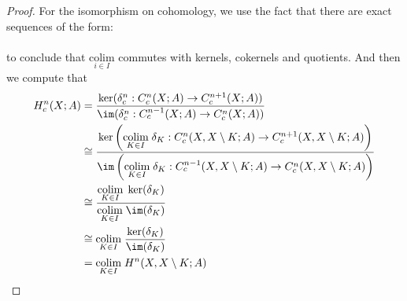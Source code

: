 \documentclass[a4paper]{article}
\begin{document}
\begin{prp}{}{}
\begin{proof}
For the isomorphism on cohomology, we use the fact that there are exact sequences of the form: \\
\\
to conclude that $\underset{i\in I}{\text{colim}}$ commutes with kernels, cokernels and quotients. And then we compute that 
\begin{align*}
H_c^n(X;A)&=\frac{\ker(\delta_c^n:C_c^n(X;A)\to C_c^{n+1}(X;A))}{\im(\delta_c^n:C_c^{n-1}(X;A)\to C_c^n(X;A))}\\
&\cong\frac{\ker\left(\underset{K\in I}{\text{colim}}\;\delta_K:C_c^n(X,X\setminus K;A)\to C_c^{n+1}(X,X\setminus K;A)\right)}{\im\left(\underset{K\in I}{\text{colim}}\;\delta_K:C_c^{n-1}(X,X\setminus K;A)\to C_c^n(X,X\setminus K;A)\right)}\\
&\cong\frac{\underset{K\in I}{\text{colim}}\;\ker(\delta_K)}{\underset{K\in I}{\text{colim}}\;\im(\delta_K)}\\
&\cong\underset{K\in I}{\text{colim}}\;\frac{\ker(\delta_K)}{\im(\delta_K)}\\
&=\underset{K\in I}{\text{colim}}\;H^n(X,X\setminus K;A)
\end{align*}
\end{proof}
\end{prp}
\end{document}
